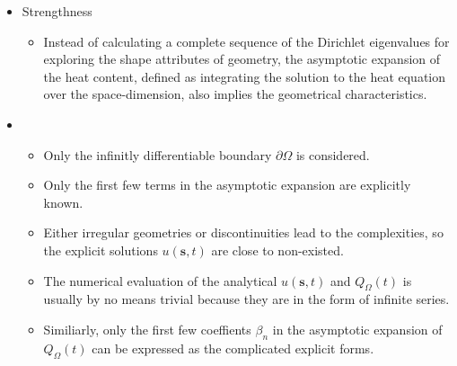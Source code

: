     \begin{itemize}
      \item Strengthness
        \begin{itemize}
          \item Instead of calculating a complete sequence of the Dirichlet eigenvalues for exploring the shape attributes of geometry, the asymptotic expansion of the heat content, defined as integrating the solution to the heat equation over the space-dimension, also implies the geometrical characteristics.  
        \end{itemize}
        
      \item
        \begin{itemize}
          \item Only the infinitly differentiable boundary $\partial \Omega$ is considered.
          \item Only the first few terms in the asymptotic expansion are explicitly known.
          \item Either irregular geometries or discontinuities lead to the complexities, so the explicit solutions $u(\bm{s}, t)$ are close to non-existed.
          \item The numerical evaluation of the analytical $u(\bm{s}, t)$ and $Q_{\Omega}(t)$ is usually by no means trivial because they are in the form of infinite series.
          \item Similiarly, only the first few coeffients $\beta_n$ in the asymptotic expansion of $Q_{\Omega}(t)$ can be expressed as the complicated explicit forms.
        \end{itemize}
        
    \end{itemize}

    
  
    
   
   




